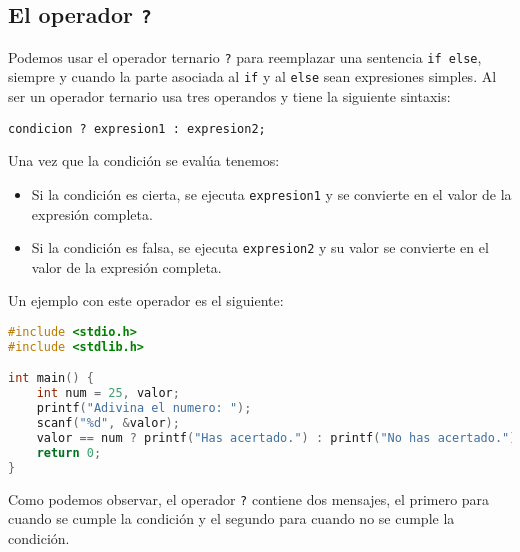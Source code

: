 \subsection{El operador \texttt{?}}{
Podemos usar el operador ternario \texttt{?} para reemplazar una sentencia \texttt{if else}, siempre y cuando la parte asociada al \texttt{if} y al \texttt{else} sean expresiones simples. Al ser un operador ternario usa tres operandos y tiene la siguiente sintaxis:

\texttt{condicion ? expresion1 : expresion2;}

Una vez que la condición se evalúa tenemos:
\begin{itemize}
	\item Si la condición es cierta, se ejecuta \texttt{expresion1} y se convierte en el valor de la expresión completa.
	\item Si la condición es falsa, se ejecuta \texttt{expresion2} y su valor se convierte en el valor de la expresión completa.
\end{itemize}
Un ejemplo con este operador es el siguiente:
\begin{Ejemplo}
\begin{lstlisting}[language=C]
#include <stdio.h>
#include <stdlib.h>

int main() {
    int num = 25, valor;
    printf("Adivina el numero: ");
    scanf("%d", &valor);
    valor == num ? printf("Has acertado.") : printf("No has acertado.");
    return 0;
}
\end{lstlisting}
\Explicacion
Como podemos observar, el operador \texttt{?} contiene dos mensajes, el primero para cuando se cumple la condición y el segundo para cuando no se cumple la condición.
\end{Ejemplo}
}
